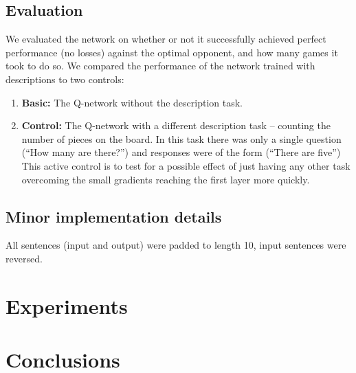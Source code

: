 \documentclass{article} %
\begin{document}
\subsection{Evaluation}
We evaluated the network on whether or not it successfully achieved perfect performance (no losses) against the optimal opponent, and how many games it took to do so. We compared the performance of the network trained with descriptions to two controls:
\begin{enumerate}
\item \textbf{Basic:} The Q-network without the description task.
\item \textbf{Control:} The Q-network with a different description task -- counting the number of pieces on the board. In this task there was only a single question (``How many are there?'') and responses were of the form (``There are five'') This active control is to test for a possible effect of just having any other task overcoming the small gradients reaching the first layer more quickly.
\end{enumerate}

\subsection{Minor implementation details}
All sentences (input and output) were padded to length 10, input sentences were reversed.

\section{Experiments}

\section{Conclusions}



\end{document}
